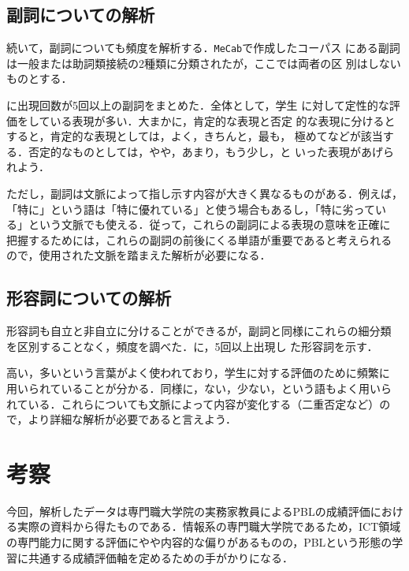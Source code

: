 \documentclass[submit]{ipsj}
\begin{document}

\subsection{副詞についての解析}
続いて，副詞についても頻度を解析する．\texttt{MeCab}で作成したコーパス
にある副詞は一般または助詞類接続の2種類に分類されたが，ここでは両者の区
別はしないものとする．

に出現回数が5回以上の副詞をまとめた．全体として，学生
に対して定性的な評価をしている表現が多い．大まかに，肯定的な表現と否定
的な表現に分けるとすると，肯定的な表現としては，よく，きちんと，最も，
極めてなどが該当する．否定的なものとしては，やや，あまり，もう少し，と
いった表現があげられよう．

ただし，副詞は文脈によって指し示す内容が大きく異なるものがある．例えば，
「特に」という語は「特に優れている」と使う場合もあるし，「特に劣ってい
る」という文脈でも使える．従って，これらの副詞による表現の意味を正確に
把握するためには，これらの副詞の前後にくる単語が重要であると考えられる
ので，使用された文脈を踏まえた解析が必要になる．


\subsection{形容詞についての解析}

形容詞も自立と非自立に分けることができるが，副詞と同様にこれらの細分類
を区別することなく，頻度を調べた．に，5回以上出現し
た形容詞を示す．

高い，多いという言葉がよく使われており，学生に対する評価のために頻繁に
用いられていることが分かる．同様に，ない，少ない，という語もよく用いら
れている．これらについても文脈によって内容が変化する（二重否定など）の
で，より詳細な解析が必要であると言えよう．

\section{考察}\label{sec:考察}

今回，解析したデータは専門職大学院の実務家教員によるPBLの成績評価におけ
る実際の資料から得たものである．情報系の専門職大学院であるため，ICT領域
の専門能力に関する評価にやや内容的な偏りがあるものの，PBLという形態の学
習に共通する成績評価軸を定めるための手がかりになる．

\end{document}
